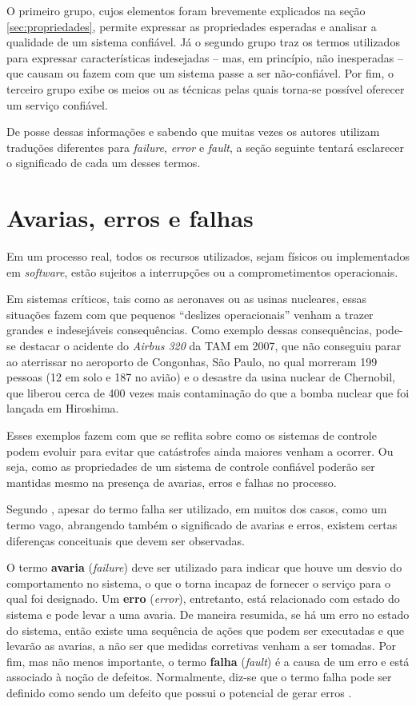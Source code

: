 O primeiro grupo, cujos elementos foram brevemente explicados na seção
\ref{sec:propriedades}, permite expressar as propriedades esperadas e analisar a
qualidade de um sistema confiável. Já o segundo grupo traz os termos utilizados
para expressar características indesejadas -- mas, em princípio, não inesperadas
-- que causam ou fazem com que um sistema passe a ser não-confiável. Por fim, o
terceiro grupo exibe os meios ou as técnicas pelas quais torna-se possível
oferecer um serviço confiável.

De posse dessas informações e sabendo que muitas vezes os autores utilizam
traduções diferentes para {\it failure}, {\it error} e {\it fault}, a seção
seguinte tentará esclarecer o significado de cada um desses termos.

\section{Avarias, erros e falhas}\label{sec:avaria_erro_falha}
Em um processo real, todos os recursos utilizados, sejam físicos ou
implementados em {\it software}, estão sujeitos a interrupções ou a
comprometimentos operacionais.

Em sistemas críticos, tais como as aeronaves ou as usinas nucleares, essas
situações fazem com que pequenos ``deslizes operacionais'' venham a trazer
grandes e indesejáveis consequências. Como exemplo dessas consequências, pode-se
destacar o acidente do {\it Airbus 320} da TAM em 2007, que não conseguiu parar
ao aterrissar no aeroporto de Congonhas, São Paulo, no qual morreram 199 pessoas
(12 em solo e 187 no avião) e o desastre da usina nuclear de Chernobil, que
liberou cerca de 400 vezes mais contaminação do que a bomba nuclear que foi
lançada em Hiroshima.

Esses exemplos fazem com que se reflita sobre como os sistemas de controle podem
evoluir para evitar que catástrofes ainda maiores venham a ocorrer. Ou seja,
como as propriedades de um sistema de controle confiável poderão ser mantidas
mesmo na presença de avarias, erros e falhas no processo.

Segundo , apesar do termo falha ser utilizado, em muitos
dos casos, como um termo vago, abrangendo também o significado de avarias e
erros, existem certas diferenças conceituais que devem ser observadas.

O termo {\bf avaria} ({\it failure}) deve ser utilizado para indicar que houve
um desvio do comportamento no sistema, o que o torna incapaz de fornecer o
serviço para o qual foi designado. Um {\bf erro} ({\it error}), entretanto, está
relacionado com estado do sistema e pode levar a uma avaria. De maneira
resumida, se há um erro no estado do sistema, então existe uma sequência de
ações que podem ser executadas e que levarão as avarias, a não ser que medidas
corretivas venham a ser tomadas. Por fim, mas não menos importante, o termo {\bf
falha} ({\it fault}) é a causa de um erro e está associado à noção de defeitos.
Normalmente, diz-se que o termo falha pode ser definido como sendo um defeito
que possui o potencial de gerar erros \cite{nelio:2002,weber:2002}.

